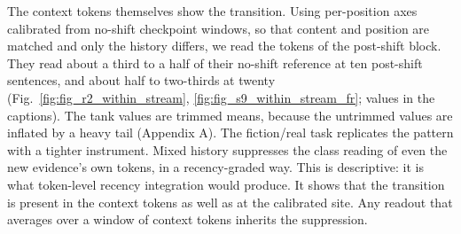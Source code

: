 \documentclass[11pt]{article}
\begin{document}
The context tokens themselves show the transition. Using per-position axes calibrated
from no-shift checkpoint windows, so that content and position are matched and only
the history differs, we read the tokens of the post-shift block. They read about a
third to a half of their no-shift reference at ten post-shift sentences, and about
half to two-thirds at twenty (Fig.~\ref{fig:fig_r2_within_stream}, \ref{fig:fig_s9_within_stream_fr};
values in the captions). The tank values are trimmed means, because the untrimmed
values are inflated by a heavy tail (Appendix A). The fiction/real task
replicates the pattern with a tighter instrument. Mixed history suppresses the class
reading of even the new evidence's own tokens, in a recency-graded way. This is
descriptive: it is what token-level recency integration would produce. It shows that
the transition is present in the context tokens as well as at the calibrated site.
Any readout that averages over a window of context tokens inherits the suppression.
\end{document}
